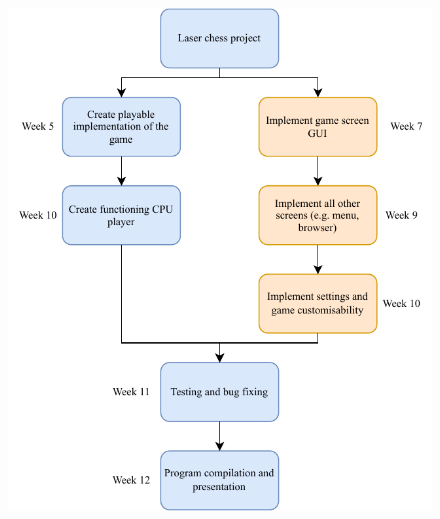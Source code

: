 \documentclass[../main/main.tex]{subfiles}
\begin{document}
\begin{figure}[ht!]
    \centering
    \includegraphics[width=\columnwidth]{../analysis/assets/critical_path_diagram.pdf}
    \label{fig:critical-path-diagram}
\end{figure}
\end{document}
